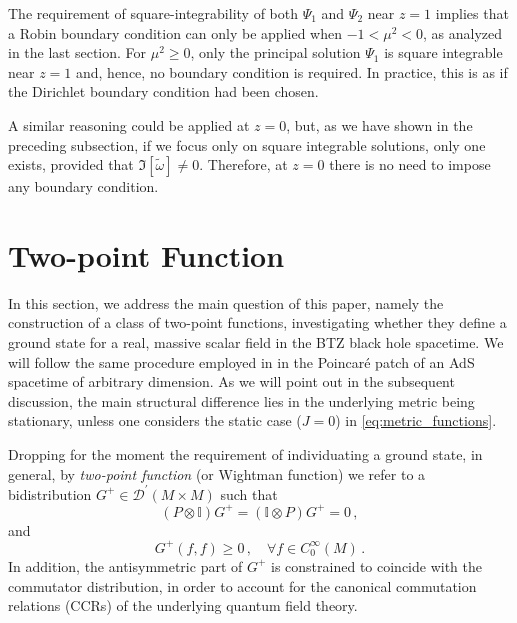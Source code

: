 \documentclass[aps, prd, amsmath, floats, floatfix, twocolumn, nofootinbib, superscriptaddress, showpacs]{revtex4-1}
\begin{document}
The requirement of square-integrability of both $\Psi_1$ and $\Psi_2$ near $z=1$ implies that a Robin boundary condition can only be applied when $-1 < \mu^2 < 0$, as analyzed in the last section. For $\mu^2 \geqslant 0$, only the principal solution $\Psi_1$ is square integrable near $z=1$ and, hence, no boundary condition is required. In practice, this is as if the Dirichlet boundary condition had been chosen.

A similar reasoning could be applied at $z=0$, but, as we have shown in the preceding subsection, if we focus only on square integrable solutions, only one exists, provided that $\Im[\tilde{\omega}] \neq 0$. Therefore, at $z=0$ there is no need to impose any boundary condition.	





\section{Two-point Function}
\label{Sec:ground_state}

In this section, we address the main question of this paper, namely the construction of a class of two-point functions, investigating whether they define a ground state for a real, massive scalar field in the BTZ black hole spacetime. We will follow the same procedure employed in \cite{Dappiaggi:2016fwc} in the Poincar\'e patch of an AdS spacetime of arbitrary dimension. As we will point out in the subsequent discussion, the main structural difference lies in the underlying metric being stationary, unless one considers the static case ($J=0$) in \eqref{eq:metric_functions}. 

Dropping for the moment the requirement of individuating a ground state, in general, by {\em two-point function} (or Wightman function) we refer to a bidistribution $G^+\in\mathcal{D}^\prime(M\times M)$ such that
% 
\begin{equation}\label{eq:eom_G}
(P\otimes\mathbb{I})G^+=(\mathbb{I}\otimes P)G^+=0 \, ,
\end{equation}
%
and 
%
\begin{equation}\label{eq:pos_G}
G^+(f,f)\geq 0 \, , \quad \forall f\in C^\infty_0(M) \, .
\end{equation}
%
In addition, the antisymmetric part of $G^+$ is constrained to coincide with the commutator distribution, in order to account for the canonical commutation relations (CCRs) of the underlying quantum field theory.
\end{document}
